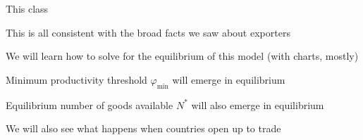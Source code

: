 \documentclass[notes,11pt, aspectratio=169, xcolor=table]{beamer}
\newenvironment{wideitemize}{\itemize\addtolength{\itemsep}{10pt}}{\enditemize}
\begin{document}
\begin{frame}{This class}
    \begin{wideitemize}
    \item This is all consistent with the broad facts we saw about exporters
    \item We will learn how to solve for the equilibrium of this model (with charts, mostly)
    \item Minimum productivity threshold $\varphi_{\min}$ will emerge in equilibrium
    \item Equilibrium number of goods available $N^*$ will also emerge in equilibrium
    \item We will also see what happens when countries open up to trade
    \end{wideitemize}
\end{frame}
\end{document}
